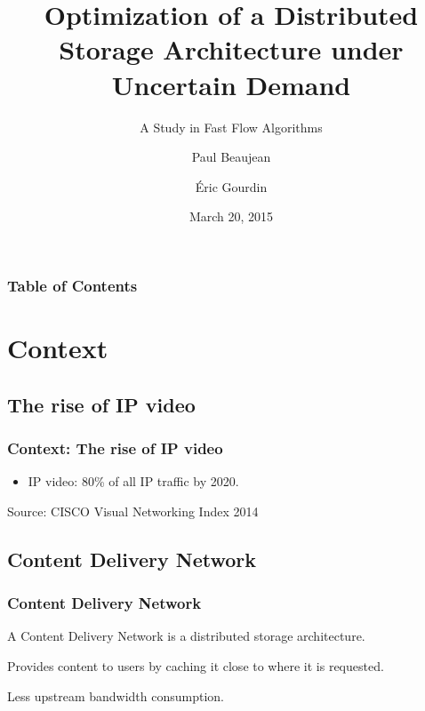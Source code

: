 \documentclass{beamer}
\title{Optimization of a Distributed Storage Architecture under Uncertain
Demand}
\subtitle{A Study in Fast Flow Algorithms}
\date{March 20, 2015}
\author{Paul Beaujean\inst{*}\inst{\dag} \and \'Eric Gourdin\inst{\dag}}
\institute{\inst{*}ENSIIE-MPRO \and \inst{\dag}Orange Labs}
\begin{document}
\frame{\titlepage}

\begin{frame}
    \frametitle{Table of Contents}
    \tableofcontents{}
\end{frame}

\section{Context}
\subsection{The rise of IP video}
\begin{frame}
    \frametitle{Context: The rise of IP video}


    \begin{itemize}
        \item IP video: 80\% of all IP traffic by 2020.
    \end{itemize}
    \hfill\tiny{Source: CISCO Visual Networking Index 2014}

\end{frame}

\subsection{Content Delivery Network}
\begin{frame}
    \frametitle{Content Delivery Network}

    A Content Delivery Network is a distributed storage architecture.

    Provides content to users by caching it close to where it is requested.

    Less upstream bandwidth consumption.
\end{frame}
\end{document}
